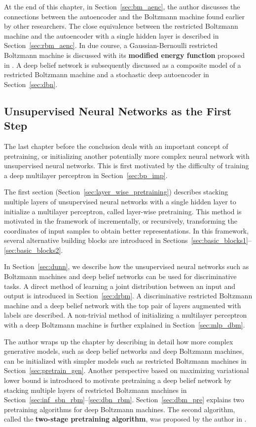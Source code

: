\documentclass[dissertation,nocontribution]{aaltoseries}
\begin{document}
At the end of this chapter, in Section~\ref{sec:bm_aenc},
the author discusses the connections between the autoencoder
and the Boltzmann machine found earlier by other
researchers. The close equivalence between the restricted
Boltzmann machine and the autoencoder with a single hidden
layer is described in Section~\ref{sec:rbm_aenc}. In due
course, a Gaussian-Bernoulli restricted
Boltzmann machine is discussed with its \textbf{modified
energy function} proposed in . A
deep belief network is subsequently discussed as a
composite model of a restricted Boltzmann machine and a
stochastic deep autoencoder in Section~\ref{sec:dbn}.


\subsection{Unsupervised Neural Networks as the First Step}

The last chapter before the conclusion deals with an
important concept of pretraining, or initializing another
potentially more complex neural network with unsupervised
neural networks. This is first motivated by the difficulty
of training a deep multilayer perceptron 
in Section~\ref{sec:bp_imp}.

The first section (Section~\ref{sec:layer_wise_pretraining})
describes stacking multiple layers of unsupervised neural
networks with a single hidden layer to initialize a
multilayer perceptron, called layer-wise
pretraining. This method is motivated in the framework of
incrementally, or recursively, transforming the coordinates
of input samples to obtain better representations. In this
framework, several alternative building blocks are
introduced in
Sections~\ref{sec:basic_blocks1}--\ref{sec:basic_blocks2}.

In Section~\ref{sec:dunn}, we describe how the unsupervised
neural networks such as Boltzmann machines and deep belief
networks can be used for discriminative tasks. A direct
method of learning a joint distribution between an input and
output is introduced in Section~\ref{sec:drbm}. A
discriminative restricted Boltzmann machine and a
deep belief network with the top pair of layers augmented
with labels are described. A non-trivial method of
initializing a multilayer perceptron with a deep Boltzmann
machine is further explained in Section~\ref{sec:mlp_dbm}.

The author wraps up the chapter by describing in detail how
more complex generative models, such as deep belief networks
and deep Boltzmann machines, can be initialized with simpler
models such as restricted Boltzmann machines in
Section~\ref{sec:pretrain_gen}. Another perspective based on
maximizing variational lower bound is introduced to motivate
pretraining a deep belief network by stacking multiple
layers of restricted Boltzmann machines in
Section~\ref{sec:inf_sbn_rbm}--\ref{sec:dbn_rbm}.
Section~\ref{sec:dbm_pre}  explains two pretraining
algorithms for deep Boltzmann machines. The second
algorithm, called the \textbf{two-stage pretraining
algorithm}, was proposed by the author in
.
\end{document}
